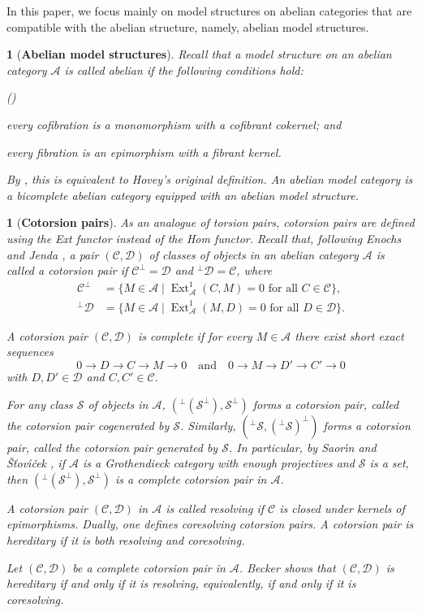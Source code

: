 \documentclass[12pt,twoside]{amsart}
\theoremstyle{bfupright head,slanted body}
\theoremstyle{bfupright head,upright body}
\newtheorem{bfhpg}[res]{}               \newtheorem*{bfhpg*}{}
\theoremstyle{fixed bf head,slanted body}
\theoremstyle{fixed bf head,upright body}
\theoremstyle{numbered paragraph}
\newlength{\thmlistleft}        %
\newlength{\thmlistright}       %
\newlength{\thmlistpartopsep}   %
\newlength{\thmlisttopsep}      %
\newlength{\thmlistparsep}      %
\newlength{\thmlistitemsep}     %
\newcounter{prt}
\newenvironment{prt}{\begin{list}{\upshape (\alph{prt})}%
    {\usecounter{prt}%
      \setlength{\leftmargin}{\thmlistleft}%
      \setlength{\labelwidth}{\thmlistleft}%
      \setlength{\rightmargin}{\thmlistright}%
      \setlength{\partopsep}{\thmlistpartopsep}%
      \setlength{\topsep}{\thmlisttopsep}%
      \setlength{\parsep}{\thmlistparsep}%
      \setlength{\itemsep}{\thmlistitemsep}}}%
  {\end{list}}%
\newcommand{\prpcite}[2][?]{\cite[Proposition~#1]{#2}}
\newcommand{\corcite}[2][?]{\cite[Corollary~#1]{#2}}
\numberwithin{equation}{res}
\newcommand{\calC}{\mathcal{C}}
\newcommand{\calA}{\mathcal{A}}
\newcommand{\calD}{\mathcal{D}}
\newcommand{\calS}{\mathcal{S}}
\newcommand{\Ext}{\operatorname{Ext}}
\begin{document}
In this paper, we focus mainly on model structures on abelian categories that are compatible with the abelian structure, namely, abelian model structures.

\begin{bfhpg}[\bf Abelian model structures]\label{thm Hovey tripls}
Recall that a model structure on an abelian category \(\calA\) is called \emph{abelian} if the following conditions hold:
\begin{prt}
\item every cofibration is a monomorphism with a cofibrant cokernel; and
\item every fibration is an epimorphism with a fibrant kernel.
\end{prt}

By \prpcite[4.2]{HOVEY2002}, this is equivalent to Hovey's original definition.
An \emph{abelian model category} is a bicomplete abelian category equipped with an abelian model structure.
\end{bfhpg}

\begin{bfhpg}[\bf Cotorsion pairs]\label{def of Cot pairs}
As an analogue of torsion pairs, cotorsion pairs are defined using the Ext functor instead of the Hom functor.
Recall that, following Enochs and Jenda \cite{rha}, a pair \((\calC,\calD)\) of classes of objects in an abelian category \(\calA\) is called a \emph{cotorsion pair} if \(\calC^{\bot}=\calD\) and \(^{\bot}\calD=\calC\), where
\begin{align*}
\calC^{\bot} &= \{ M \in \calA \mid \Ext_{\calA}^{1}(C,M)=0 \text{ for all } C\in\calC \}, \\
^{\bot}\calD &= \{ M \in \calA \mid \Ext_{\calA}^{1}(M,D)=0 \text{ for all } D\in\calD \}.
\end{align*}

A cotorsion pair \((\calC,\calD)\) is \emph{complete} if for every \(M\in\calA\) there exist short exact sequences
\[ 0\to D\to C\to M\to 0 \quad \textrm{and} \quad 0\to M\to D'\to C'\to 0 \]
with \(D,D'\in\calD\) and \(C,C'\in\calC\).

For any class \(\calS\) of objects in \(\calA\), \((^\bot(\calS^\bot),\calS^\bot)\) forms a cotorsion pair, called the cotorsion pair \emph{cogenerated} by \(\calS\). Similarly, \((^\bot\calS,(^\bot\calS)^\bot)\) forms a cotorsion pair, called the cotorsion pair \emph{generated} by \(\calS\). In particular, by Saor\'{\i}n and \v{S}\v{t}ov\'{\i}\v{c}ek \corcite[2.15(3)]{2013Sto}, if \(\calA\) is a Grothendieck category with enough projectives and \(\calS\) is a set, then \((^\bot(\calS^\bot),\calS^\bot)\) is a complete cotorsion pair in \(\calA\).

A cotorsion pair \((\calC,\calD)\) in \(\calA\) is called \emph{resolving} if \(\calC\) is closed under kernels of epimorphisms. Dually, one defines \emph{coresolving} cotorsion pairs. A cotorsion pair is \emph{hereditary} if it is both resolving and coresolving.

Let \((\calC,\calD)\) be a complete cotorsion pair in \(\calA\). Becker \cite{Be14} shows that \((\calC,\calD)\) is hereditary if and only if it is resolving, equivalently, if and only if it is coresolving.
\end{bfhpg}
\end{document}
